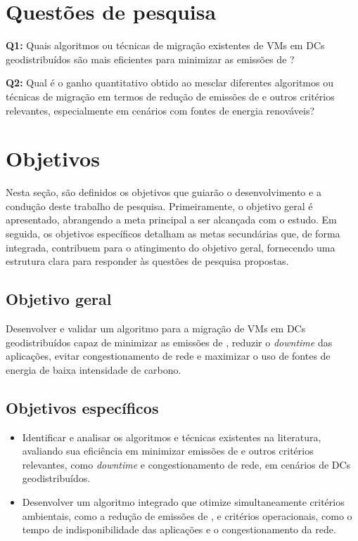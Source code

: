 \documentclass[
	12pt,				%
	oneside,			%
	a4paper,			%
	english,			%
	brazil				%
	]{abntex2ppgsi}
\begin{document}
\section{Questões de pesquisa}
\textbf{Q1:} Quais algoritmos ou técnicas de migração existentes de VMs em DCs geodistribuídos são mais eficientes para minimizar as emissões de ?

\textbf{Q2:} Qual é o ganho quantitativo obtido ao mesclar diferentes algoritmos ou técnicas de migração em termos de redução de emissões de  e outros critérios relevantes, especialmente em cenários com fontes de energia renováveis?

\section{Objetivos}
Nesta seção, são definidos os objetivos que guiarão o desenvolvimento e a condução deste trabalho de pesquisa. Primeiramente, o objetivo geral é apresentado, abrangendo a meta principal a ser alcançada com o estudo. Em seguida, os objetivos específicos detalham as metas secundárias que, de forma integrada, contribuem para o atingimento do objetivo geral, fornecendo uma estrutura clara para responder às questões de pesquisa propostas.

\subsection{Objetivo geral}
Desenvolver e validar um algoritmo para a migração de VMs em DCs geodistribuídos capaz de minimizar as emissões de , reduzir o \textit{downtime} das aplicações, evitar congestionamento de rede e maximizar o uso de fontes de energia de baixa intensidade de carbono.

\subsection{Objetivos específicos}
\begin{itemize}
	\item Identificar e analisar os algoritmos e técnicas existentes na literatura, avaliando sua eficiência em minimizar emissões de  e outros critérios relevantes, como \textit{downtime} e congestionamento de rede, em cenários de DCs geodistribuídos.
	\item Desenvolver um algoritmo integrado que otimize simultaneamente critérios ambientais, como a redução de emissões de , e critérios operacionais, como o tempo de indisponibilidade das aplicações e o congestionamento da rede.
\end{itemize}
\end{document}
